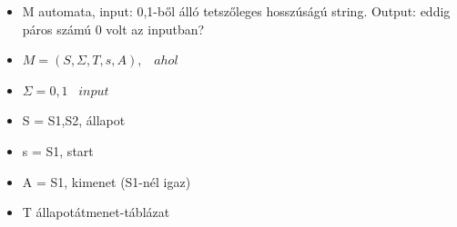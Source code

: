 \documentclass[12pt,a4paper]{article}
\begin{document}
            \begin{tcolorbox}[colback=blue!5!white,colframe=blue!50!black,title=2. Ismertesse a determinisztikus véges automata megadását és működését!]
        \begin{itemize}
            \item M automata, input: 0,1-ből álló tetszőleges hosszúságú string. Output: eddig páros számú 0 volt az inputban?
            \item \(M=(S, \Sigma ,T,s,A) ,\hspace{10pt} ahol\)
            \item \(\Sigma ={0,1} \hspace{10pt} input\)
            \item S = {S1,S2}, állapot
            \item s = S1, start
            \item A = {S1}, kimenet (S1-nél igaz)
            \item T állapotátmenet-táblázat
        \end{itemize}
        \begin{center}
        \end{center}
            \end{tcolorbox}
\end{document}
